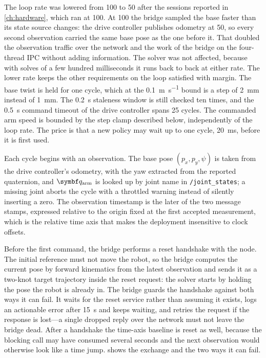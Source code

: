 The loop rate was lowered from \qty{100}{\hz} to \qty{50}{\hz} after the
sessions reported in \cref{ch:hardware}, which ran at \qty{100}{\hz}.
At \qty{100}{\hz} the bridge sampled the base faster than its state
source changes: the drive controller publishes odometry at
\qty{50}{\hz}, so every second observation carried the same base pose
as the one before it. That doubled the observation traffic over the
network and the work of the bridge on the four-thread IPC without adding
information. The solver was not affected, because with solves of a few
hundred milliseconds it runs back to back at either rate. The lower rate
keeps the other requirements on the loop satisfied with margin. The base
twist is held for one cycle, which at the \qty{0.1}{\meter\per\second}
bound is a step of \qty{2}{\milli\meter} instead of
\qty{1}{\milli\meter}. The \qty{0.2}{\second} staleness window is still
checked ten times, and the \qty{0.5}{\second} command timeout of the
drive controller spans 25 cycles. The commanded arm speed is bounded by
the step clamp described below, independently of the loop rate. The
price is that a new policy may wait up to one cycle,
\qty{20}{\milli\second}, before it is first used.

Each cycle begins with an observation. The base pose $(p_x, p_y, \psi)$
is taken from the drive controller's odometry, with the yaw extracted
from the reported quaternion, and $\qarm$ is looked up by joint name in
\texttt{/joint\_states}; a missing joint aborts the cycle with a
throttled warning instead of silently inserting a zero. The observation
timestamp is the later of the two message stamps, expressed relative to
the origin fixed at the first accepted measurement, which is the
relative time axis that makes the deployment insensitive to clock
offsets.

Before the first command, the bridge performs a reset handshake with the
\mpc{} node. The initial reference must not move the robot, so the
bridge computes the current \ee{} pose by forward kinematics from the
latest observation and sends it as a two-knot target trajectory inside
the reset request: the solver starts by holding the pose the robot is
already in. The bridge guards the handshake against both ways it can
fail. It waits for
the reset service rather than assuming it exists, logs an actionable
error after \qty{15}{\second} and keeps waiting, and retries the request
if the response is lost---a single dropped reply over the network must
not leave the bridge dead. After a handshake the time-axis baseline is
reset as well, because the blocking call may have consumed several
seconds and the next observation would otherwise look like a time jump.
 shows the exchange and the two ways it can
fail.

